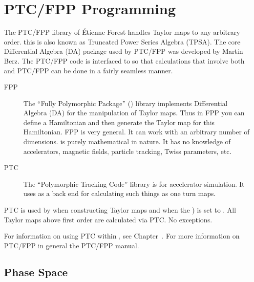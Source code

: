 \chapter{PTC/FPP Programming}
\label{c:ptc.program}


The PTC/FPP library of \'Etienne Forest handles Taylor maps to any arbitrary order. this is also
known as Truncated Power Series Algebra (TPSA). The core Differential Algebra (DA) package used by
PTC/FPP was developed by Martin Berz\cite{b:berz}. The PTC/FPP code is interfaced to \bmad so
that calculations that involve both \bmad and PTC/FPP can be done in a fairly seamless manner.

\begin{description}
\item[FPP] \Newline
The ``Fully Polymorphic Package'' () library implements Differential Algebra (DA) for the
manipulation of Taylor maps. Thus in FPP you can define a Hamiltonian and then generate the Taylor
map for this Hamiltonian. FPP is very general. It can work with an arbitrary number of dimensions.
 is purely mathematical in nature. It has no knowledge of accelerators, magnetic
fields, particle tracking, Twiss parameters, etc. 

\item[PTC] \Newline
The ``Polymorphic Tracking Code''  library is for accelerator simulation. It uses
 as a back end for calculating such things as one turn maps.
\end{description}

PTC is used by \bmad when constructing Taylor maps and when the 
) is set to . All Taylor maps above first order are calculated
via PTC. No exceptions.

For information on using PTC within \bmad, see Chapter~.  For more information on
PTC/FPP in general the PTC/FPP manual\cite{b:ptc}.

\section{Phase Space}
\label{s:ptc.space}

